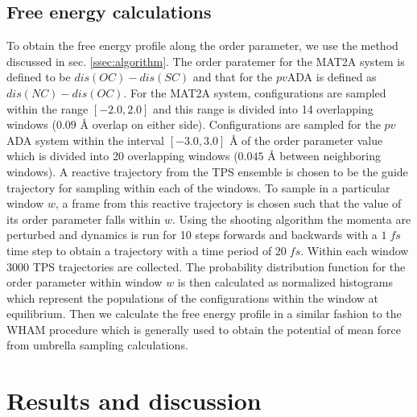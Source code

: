 \documentclass[journal=jpcbfk,manuscript=article,layout=traditional]{achemso}
\begin{document}
\subsection{Free energy calculations}
To obtain the free energy profile along the order parameter, we use the method 
discussed in sec. \ref{ssec:algorithm}. The order paratemer for the MAT2A system 
is defined to be $dis(OC)-dis(SC)$ and that for the $pv$ADA is defined as 
$dis(NC)-dis(OC)$. For the MAT2A system, configurations are sampled within 
the range $[-2.0,2.0]$ and this range is divided into 14 overlapping windows 
($0.09$ {\AA} overlap on either side). 
Configurations are sampled for the $pv$ADA system within the interval $[-3.0, 3.0]$ {\AA}
of the order parameter value which is divided into 20 overlapping 
windows ($0.045$ {\AA} between neighboring windows). A reactive 
trajectory from the TPS ensemble is chosen to be the guide trajectory 
for sampling within each of the windows. To sample in a particular window $w$, a 
frame from this reactive trajectory is chosen such that the value of its 
order parameter falls within $w$. Using the shooting algorithm
the momenta are perturbed and dynamics is run for 10 steps forwards and backwards with a 
$1\;fs$ time step to obtain a trajectory with a time period of $20\;fs$.    
Within each window 3000 TPS trajectories are collected. The 
probability distribution function for the order parameter within window $w$ 
is then calculated as normalized histograms which represent the populations 
of the configurations within the window at equilibrium. 
Then we calculate the free energy profile in a similar fashion to the WHAM 
procedure \cite{Kumar92JComputChem13p1011} which is generally used to obtain the 
potential of mean force from umbrella sampling calculations. 
\section{Results and discussion}
\end{document}

